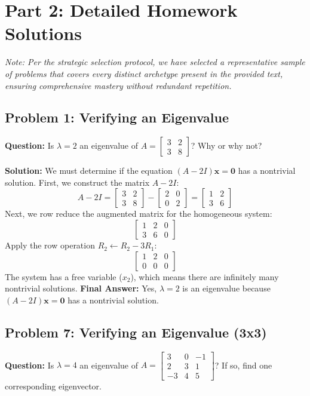\documentclass[11pt, a4paper]{article}
\theoremstyle{definition}
\theoremstyle{remark}
\begin{document}
\newpage
\section{Part 2: Detailed Homework Solutions}
\textit{Note: Per the strategic selection protocol, we have selected a representative sample of problems that covers every distinct archetype present in the provided text, ensuring comprehensive mastery without redundant repetition.}

\subsection{Problem 1: Verifying an Eigenvalue}
\textbf{Question:} Is $\lambda = 2$ an eigenvalue of $A = \begin{bmatrix} 3 & 2 \\ 3 & 8 \end{bmatrix}$? Why or why not?

\textbf{Solution:}
We must determine if the equation $(A - 2I)\mathbf{x} = \mathbf{0}$ has a nontrivial solution. First, we construct the matrix $A - 2I$:
\[
A - 2I = \begin{bmatrix} 3 & 2 \\ 3 & 8 \end{bmatrix} - \begin{bmatrix} 2 & 0 \\ 0 & 2 \end{bmatrix} = \begin{bmatrix} 1 & 2 \\ 3 & 6 \end{bmatrix}
\]
Next, we row reduce the augmented matrix for the homogeneous system:
\[
\begin{bmatrix} 1 & 2 & 0 \\ 3 & 6 & 0 \end{bmatrix}
\]
Apply the row operation $R_2 \leftarrow R_2 - 3R_1$:
\[
\begin{bmatrix} 1 & 2 & 0 \\ 0 & 0 & 0 \end{bmatrix}
\]
The system has a free variable ($x_2$), which means there are infinitely many nontrivial solutions. 
\textbf{Final Answer:} Yes, $\lambda = 2$ is an eigenvalue because $(A - 2I)\mathbf{x} = \mathbf{0}$ has a nontrivial solution.

\subsection{Problem 7: Verifying an Eigenvalue (3x3)}
\textbf{Question:} Is $\lambda = 4$ an eigenvalue of $A = \begin{bmatrix} 3 & 0 & -1 \\ 2 & 3 & 1 \\ -3 & 4 & 5 \end{bmatrix}$? If so, find one corresponding eigenvector.
\end{document}
